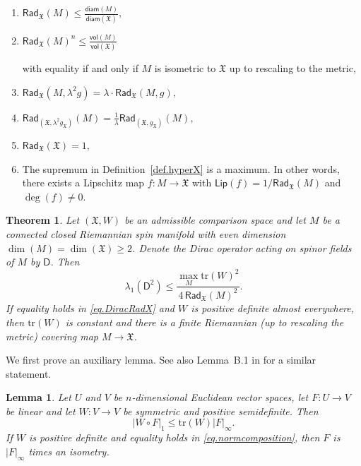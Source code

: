 \documentclass[11pt,reqno]{amsart}
\newcommand{\RadX}{\mathsf{Rad}_{\XX}}
\newcommand{\diam}{\mathsf{diam}}
\newcommand{\Lip}{\mathsf{Lip}}
\newcommand{\XX}{\mathfrak{X}}
\newcommand{\tr}{\mathrm{tr}}
\newcommand{\D}{\mathsf{D}}
\newcommand{\<}{\langle}
\renewcommand{\>}{\rangle}
\newcommand{\vol}{\mathsf{vol}}
\newcommand{\myicon}{$\,\,\,\triangleright$}
\newcommand{\listdisplay}[1]{\vspace{2mm}\hfill \( \displaystyle #1\)\hfill\mbox{}\vspace{1mm}}
\newtheorem{theorem}{Theorem}
\newtheorem{lemma}{Lemma}
\theoremstyle{definition}
\begin{document}
\begin{enumerate}[\myicon]
\item
\listdisplay{\RadX(M)\le \frac{\diam(M)}{\diam(\XX)},}
\item
\listdisplay{\RadX(M)^n \le \frac{\vol(M)}{\vol(\XX)}}

\noindent
with equality if and only if $M$ is isometric to $\XX$ up to rescaling to the metric,
\item
\listdisplay{\RadX(M,\lambda^2g) = \lambda\cdot\RadX(M,g),}
\item
\listdisplay{\mathsf{Rad}_{(\XX,\lambda^2g_\XX)}(M) = \tfrac{1}{\lambda}\mathsf{Rad}_{(\XX,g_\XX)}(M),}
\item
\listdisplay{\RadX(\XX)=1,}
\item 
The supremum in Definition~\ref{def.hyperX} is a maximum.
In other words, there exists a Lipschitz map $f\colon M\to \XX$ with $\Lip(f)= 1/\RadX(M)$ and $\deg(f)\neq0$.
\end{enumerate}

\begin{theorem}\label{thm.DiracRadX}
Let $(\XX,W)$ be an admissible comparison space and let $M$ be a connected closed Riemannian spin manifold with even dimension $\dim(M)=\dim(\XX)\ge2$.
Denote the Dirac operator acting on spinor fields of $M$ by $\D$.
Then
\begin{equation}
\lambda_1(\D^2) \le \frac{\max_M \tr(W)^2}{4\,\RadX(M)^2}.
\label{eq.DiracRadX}
\end{equation}
If equality holds in \eqref{eq.DiracRadX} and $W$ is positive definite almost everywhere, then $\tr(W)$ is constant and there is a finite Riemannian (up to rescaling the metric) covering map $M\to\XX$.
\end{theorem}

We first prove an auxiliary lemma.
See also Lemma~B.1 in \cite{CHZ} for a similar statement.

\begin{lemma}
\label{lem.normcomposition}
Let $U$ and $V$ be $n$-dimensional Euclidean vector spaces, let $F\colon U\to V$ be linear and let $W\colon V\to V$ be symmetric and positive semidefinite.
Then
\begin{equation}
|W\circ F|_1 \le \tr(W) |F|_\infty.
\label{eq.normcomposition}
\end{equation}
If $W$ is positive definite and equality holds in \eqref{eq.normcomposition}, then $F$ is $|F|_\infty$ times an isometry.
\end{lemma}
\end{document}
